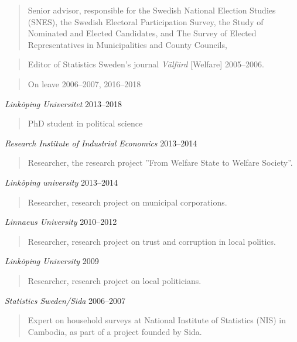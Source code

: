 \documentclass[11pt,]{article}
\begin{document}
\begin{quote}
Senior advisor, responsible for the Swedish National Election Studies
(SNES), the Swedish Electoral Participation Survey, the Study of
Nominated and Elected Candidates, and The Survey of Elected
Representatives in Municipalities and County Councils,
\end{quote}

\begin{quote}
Editor of Statistics Sweden's journal \emph{Välfärd} {[}Welfare{]}
2005--2006.
\end{quote}

\begin{quote}
On leave 2006--2007, 2016--2018
\end{quote}

\emph{Linköping Universitet} \hfill 2013--2018

\begin{quote}
PhD student in political science
\end{quote}

\emph{Research Institute of Industrial Economics} \hfill 2013--2014

\begin{quote}
Researcher, the research project ''From Welfare State to Welfare
Society''.
\end{quote}

\emph{Linköping university} \hfill 2013--2014

\begin{quote}
Researcher, research project on municipal corporations.
\end{quote}

\emph{Linnaeus University} \hfill 2010--2012

\begin{quote}
Researcher, research project on trust and corruption in local politics.
\end{quote}

\emph{Linköping University} \hfill 2009

\begin{quote}
Researcher, research project on local politicians.
\end{quote}

\emph{Statistics Sweden/Sida} \hfill 2006--2007

\begin{quote}
Expert on household surveys at National Institute of Statistics (NIS) in
Cambodia, as part of a project founded by Sida.
\end{quote}
\end{document}
